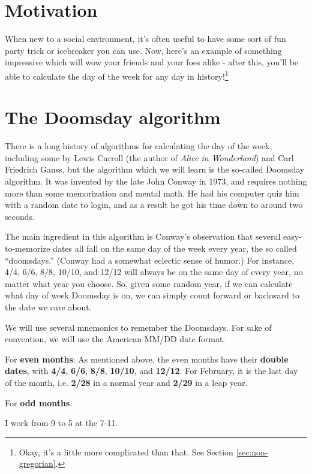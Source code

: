 \documentclass[12pt,letterpaper]{article}
\theoremstyle{plain}
\theoremstyle{definition}
\begin{document}
\section{Motivation}

When new to a social environment, it's often useful to have some sort of fun party trick or icebreaker you can use. Now, here's an example of something impressive which will wow your friends and your foes alike - after this, you'll be able to calculate the day of the week for any day in history!\footnote{Okay, it's a little more complicated than that. See Section \ref{sec:non-gregorian}.}

\section{The Doomsday algorithm}\label{sec:leapyear}

There is a long history of algorithms for calculating the day of the week, including some by Lewis Carroll (the author of \textit{Alice in Wonderland}) and Carl Friedrich Gauss, but the algorithm which we will learn is the so-called Doomsday algorithm. It was invented by the late John Conway in 1973, and requires nothing more than some memorization and mental math. He had his computer quiz him with a random date to login, and as a result he got his time down to around two seconds. 

The main ingredient in this algorithm is Conway's observation that several easy-to-memorize dates all fall on the same day of the week every year, the so called ``doomsdays.'' (Conway had a somewhat eclectic sense of humor.) For instance, 4/4, 6/6, 8/8, 10/10, and 12/12 will always be on the same day of every year, no matter what year you choose. So, given some random year, if we can calculate what day of week Doomsday is on, we can simply count forward or backward to the date we care about. 

We will use several mnemonics to remember the Doomsdays. For sake of convention, we will use the American MM/DD date format. 

For \textbf{even months}: As mentioned above, the even months have their \textbf{double dates}, with \textbf{4/4}, \textbf{6/6}, \textbf{8/8}, \textbf{10/10}, and \textbf{12/12}. For February, it is the last day of the month, i.e. \textbf{2/28} in a normal year and \textbf{2/29} in a leap year. 

For \textbf{odd months}: 

\begin{displayquote}
	I work from 9 to 5 at the 7-11. 
\end{displayquote}
\end{document}
